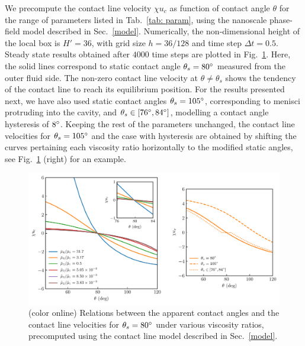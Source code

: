 We precompute the contact line velocity $\chi u_c$ as function of contact angle $\theta$ for the range of parameters listed in Tab.\ \ref{tab: param}, using the nanoscale phase-field model described in Sec.\ \ref{model}.
Numerically, the non-dimensional height of the local box is $H'=36$, with grid size $h = 36/128$ and time step $\Delta t=0.5$. Steady state results obtained after $4000$ time steps are plotted in Fig.\ \ref{fig:tabulated}. 
Here, the solid lines correspond to static contact angle $\theta_s=80\degree$ measured from the outer fluid side. The non-zero contact line velocity at $\theta \neq \theta_s$ shows the tendency of the contact line to reach its equilibrium position. For the results presented next, we have also used static contact angles $\theta_s=105\degree$, corresponding to menisci protruding into the cavity, and $\theta_s \in[76\degree , 84\degree]$, modelling a contact angle hysteresis of $8\degree$. Keeping the rest of the parameters unchanged, the contact line velocities for  $\theta_s=105\degree$ and the case with hysteresis are obtained by shifting the curves pertaining each viscosity ratio horizontally to the modified static angles, see Fig.\ \ref{fig:tabulated} (right) for an example.  

\begin{figure}[t]
 \begin{center}
   \includegraphics[width=.9\columnwidth]{phase-field22.pdf}
 \end{center}
 \caption{(color online) Relations between the apparent contact angles and the contact line velocities for $\theta_s=80\degree$ under various viscosity ratios, precomputed using the contact line model described in Sec.\ \ref{model}. }
 \label{fig:tabulated}
\end{figure}


